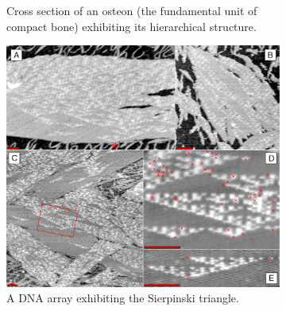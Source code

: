 \begin{figure}
\begin{subfigure}{.31\linewidth}
  \caption{Cross section of an osteon (the fundamental unit of compact bone) exhibiting its hierarchical structure.}
  \label{fig:osteon}
\end{subfigure}\hfill
\begin{subfigure}{.31\linewidth}\centering
  \includegraphics[width=\linewidth]{img/Rothemund-DNA-SierpinskiGasket}
  \caption{A DNA array exhibiting the Sierpinski triangle.}
  \label{fig:sierpinski}
\end{subfigure}
\caption{}
\end{figure}


